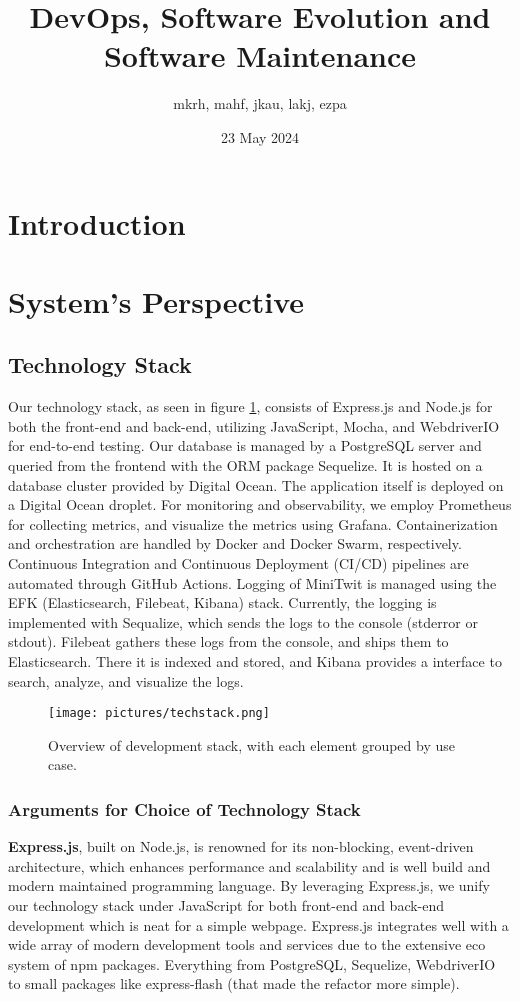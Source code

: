 \documentclass[11pt]{article}
\title{DevOps, Software Evolution and Software Maintenance}
\author{mkrh, mahf, jkau, lakj, ezpa}
\date{23 May 2024}
\begin{document}
\maketitle

\section{Introduction}


\section{System's Perspective}
\subsection{Technology Stack}
Our technology stack, as seen in figure \ref{fig:dev-stack}, consists of Express.js and Node.js for both the front-end and back-end, utilizing JavaScript, Mocha, and WebdriverIO for end-to-end testing. Our database is managed by a PostgreSQL server and queried from the frontend with the ORM package Sequelize. It is hosted on a database cluster provided by Digital Ocean. The application itself is deployed on a Digital Ocean droplet. For monitoring and observability, we employ Prometheus for collecting metrics, and visualize the metrics using Grafana. Containerization and orchestration are handled by Docker and Docker Swarm, respectively. Continuous Integration and Continuous Deployment (CI/CD) pipelines are automated through GitHub Actions. Logging of MiniTwit is managed using the EFK (Elasticsearch, Filebeat, Kibana) stack. Currently, the logging is implemented with Sequalize, which sends the logs to the console (stderror or stdout). Filebeat gathers these logs from the console, and ships them to Elasticsearch. There it is indexed and stored, and Kibana provides a interface to search, analyze, and visualize the logs.

\begin{figure}[!h]
    \centering
    \texttt{[image: pictures/techstack.png]}
    \caption{Overview of development stack, with each element grouped by use case.}
    \label{fig:dev-stack}
\end{figure}

\subsubsection{Arguments for Choice of Technology Stack}
\textbf{Express.js}, built on Node.js, is renowned for its non-blocking, event-driven architecture, which enhances performance and scalability and is well build and modern maintained programming language. By leveraging Express.js, we unify our technology stack under JavaScript for both front-end and back-end development which is neat for a simple webpage. Express.js integrates well with a wide array of modern development tools and services due to the extensive eco system of npm packages. Everything from PostgreSQL, Sequelize, WebdriverIO to small packages like express-flash (that made the refactor more simple).
\end{document}
